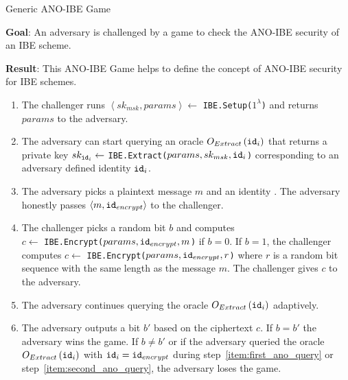\begin{game}
\caption{Generic ANO-IBE Game~\cite{thesis:Alfredo08}}
\label{game:ano_ibe}
\begin{description}
 \item \textbf{Goal}: An adversary is challenged by a game to check the ANO-IBE security of an IBE scheme.
 
 \item \textbf{Result}: This ANO-IBE Game helps to define the concept of ANO-IBE security for IBE schemes.
\end{description}
 \begin{enumerate}
  \item The challenger runs $\left< sk_{msk}, params\right> \leftarrow$ \texttt{IBE.Setup($1^{\lambda}$)} and returns $params$ to the adversary.
  \item \label{item:first_ano_query} The adversary can start querying an oracle $O_{Extract} \left( \mathtt{id}_{i} \right)$ that returns a private key $sk_{\mathtt{id}_{i}} \leftarrow$ \texttt{IBE.Extract($params, sk_{msk}, \mathtt{id}_{i}$)} corresponding to an adversary defined identity $\mathtt{id}_{i}$.
  \item The adversary picks a plaintext message $m$ and an identity . The adversary honestly passes $\left< m, \mathtt{id}_{encrypt} \right>$ to the challenger.
  \item The challenger picks a random bit $b$ and computes \\ $c \leftarrow$ \texttt{IBE.Encrypt($params, \mathtt{id}_{encrypt}, m$)} if $b=0$. If $b=1$, the challenger computes $c \leftarrow$ \texttt{IBE.Encrypt($params, \mathtt{id}_{encrypt}, r$)} where $r$ is a random bit sequence with the same length as the message $m$. The challenger gives $c$ to the adversary.
  \item \label{item:second_ano_query} The adversary continues querying the oracle $O_{Extract} \left( \mathtt{id}_{i} \right)$ adaptively.
  \item The adversary outputs a bit $b'$ based on the ciphertext $c$. If $b = b'$ the adversary wins the game. If $b \neq b'$ or if the adversary queried the oracle $O_{Extract} \left( \mathtt{id}_{i} \right)$ with $\mathtt{id}_{i} = \mathtt{id}_{encrypt}$ during step~\ref{item:first_ano_query} or step~\ref{item:second_ano_query}, the adversary loses the game.
 \end{enumerate}
\end{game}



